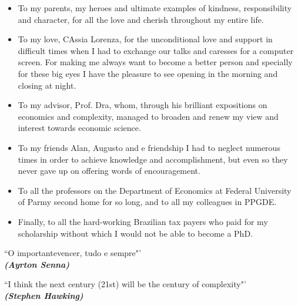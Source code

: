 \documentclass[a4paper,12pt,openright,oneside]{book}
\begin{document}
\begin{itemize}
   \item To my parents, my heroes and ultimate examples of kindness, responsibility and character, for all the love and cherish throughout my entire life.
   \item To my love, CAssia Lorenza, for the unconditional love and support in difficult times when I had to exchange our talks and caresses for a computer screen. For making me always want to become a better person and specially for these big eyes I have the pleasure to see opening in the morning and closing at night. 
	\item To my advisor, Prof. Dra, whom, through his brilliant expositions on economics and complexity, managed to broaden and renew my view and interest towards economic science.
	\item To my friends Alan, Augusto and e friendship I had to neglect numerous times in order to achieve knowledge and accomplishment, but even so they never gave up on offering words of encouragement.
	\item To all the professors on the Department of Economics at Federal University of Parmy second home for so long, and to all my colleagues in PPGDE.
	\item Finally, to all the hard-working Brazilian tax payers who paid for my scholarship without which I would not be able to become a PhD.

 \end{itemize}
 

\newpage
\vspace*{10cm}
\begin{flushright}
``O importantevencer, tudo e sempre"'
\\
\textit{\textbf{(Ayrton Senna)}}
\end{flushright}

\vspace{2cm}
\begin{flushright}
``I think the next century (21st) will be the century of complexity"'
\\
\textit{\textbf{(Stephen Hawking)}}
\end{flushright}

\newpage
\tableofcontents

\newpage
\listoftables
\end{document}
